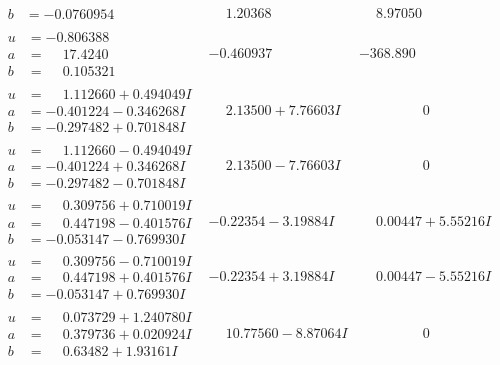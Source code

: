\documentclass[1p]{elsarticle_modified}
\theoremstyle{definition}
\begin{document}
$$\begin{array}{c|c|c}
\begin{aligned}
b &= -0.0760954\phantom{ +0.000000I}\end{aligned}
 & \phantom{-}1.20368\phantom{ +0.000000I} & \phantom{-}8.97050\phantom{ +0.000000I} \\ \hline\begin{aligned}
u &= -0.806388\phantom{ +0.000000I} \\
a &= \phantom{-}17.4240\phantom{ +0.000000I} \\
b &= \phantom{-}0.105321\phantom{ +0.000000I}\end{aligned}
 & -0.460937\phantom{ +0.000000I} & -368.890\phantom{ +0.000000I} \\ \hline\begin{aligned}
u &= \phantom{-}1.112660 + 0.494049 I \\
a &= -0.401224 - 0.346268 I \\
b &= -0.297482 + 0.701848 I\end{aligned}
 & \phantom{-}2.13500 + 7.76603 I & \phantom{-0.000000 } 0 \\ \hline\begin{aligned}
u &= \phantom{-}1.112660 - 0.494049 I \\
a &= -0.401224 + 0.346268 I \\
b &= -0.297482 - 0.701848 I\end{aligned}
 & \phantom{-}2.13500 - 7.76603 I & \phantom{-0.000000 } 0 \\ \hline\begin{aligned}
u &= \phantom{-}0.309756 + 0.710019 I \\
a &= \phantom{-}0.447198 - 0.401576 I \\
b &= -0.053147 - 0.769930 I\end{aligned}
 & -0.22354 - 3.19884 I & \phantom{-}0.00447 + 5.55216 I \\ \hline\begin{aligned}
u &= \phantom{-}0.309756 - 0.710019 I \\
a &= \phantom{-}0.447198 + 0.401576 I \\
b &= -0.053147 + 0.769930 I\end{aligned}
 & -0.22354 + 3.19884 I & \phantom{-}0.00447 - 5.55216 I \\ \hline\begin{aligned}
u &= \phantom{-}0.073729 + 1.240780 I \\
a &= \phantom{-}0.379736 + 0.020924 I \\
b &= \phantom{-}0.63482 + 1.93161 I\end{aligned}
 & \phantom{-}10.77560 - 8.87064 I & \phantom{-0.000000 } 0 \\ \hline\begin{aligned}

\end{aligned}
\end{array}$$
\end{document}
